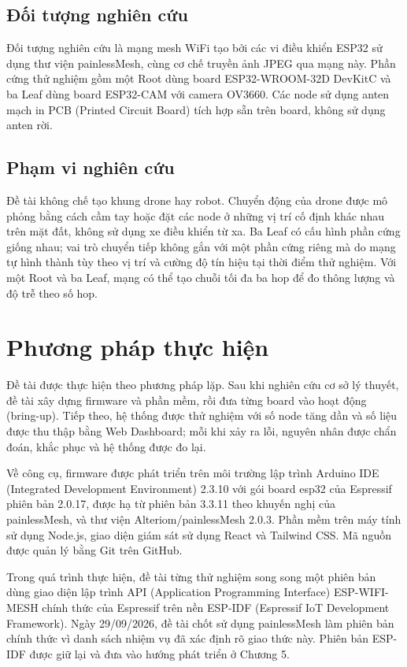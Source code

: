 \subsection{Đối tượng nghiên cứu}

Đối tượng nghiên cứu là mạng mesh WiFi tạo bởi các vi điều khiển ESP32 sử dụng thư viện painlessMesh, cùng cơ chế truyền ảnh JPEG qua mạng này. Phần cứng thử nghiệm gồm một Root dùng board ESP32-WROOM-32D DevKitC và ba Leaf dùng board ESP32-CAM với camera OV3660. Các node sử dụng anten mạch in PCB (Printed Circuit Board) tích hợp sẵn trên board, không sử dụng anten rời.

\subsection{Phạm vi nghiên cứu}

Đề tài không chế tạo khung drone hay robot. Chuyển động của drone được mô phỏng bằng cách cầm tay hoặc đặt các node ở những vị trí cố định khác nhau trên mặt đất, không sử dụng xe điều khiển từ xa. Ba Leaf có cấu hình phần cứng giống nhau; vai trò chuyển tiếp không gắn với một phần cứng riêng mà do mạng tự hình thành tùy theo vị trí và cường độ tín hiệu tại thời điểm thử nghiệm. Với một Root và ba Leaf, mạng có thể tạo chuỗi tối đa ba hop để đo thông lượng và độ trễ theo số hop.


\section{Phương pháp thực hiện}

Đề tài được thực hiện theo phương pháp lặp. Sau khi nghiên cứu cơ sở lý thuyết, đề tài xây dựng firmware và phần mềm, rồi đưa từng board vào hoạt động (bring-up). Tiếp theo, hệ thống được thử nghiệm với số node tăng dần và số liệu được thu thập bằng Web Dashboard; mỗi khi xảy ra lỗi, nguyên nhân được chẩn đoán, khắc phục và hệ thống được đo lại.

Về công cụ, firmware được phát triển trên môi trường lập trình Arduino IDE (Integrated Development Environment) 2.3.10 với gói board esp32 của Espressif phiên bản 2.0.17, được hạ từ phiên bản 3.3.11 theo khuyến nghị của painlessMesh, và thư viện Alteriom/painlessMesh 2.0.3. Phần mềm trên máy tính sử dụng Node.js, giao diện giám sát sử dụng React và Tailwind CSS. Mã nguồn được quản lý bằng Git trên GitHub.

Trong quá trình thực hiện, đề tài từng thử nghiệm song song một phiên bản dùng giao diện lập trình API (Application Programming Interface) ESP-WIFI-MESH chính thức của Espressif trên nền ESP-IDF (Espressif IoT Development Framework). Ngày 29/09/2026, đề tài chốt sử dụng painlessMesh làm phiên bản chính thức vì danh sách nhiệm vụ đã xác định rõ giao thức này. Phiên bản ESP-IDF được giữ lại và đưa vào hướng phát triển ở Chương 5.


